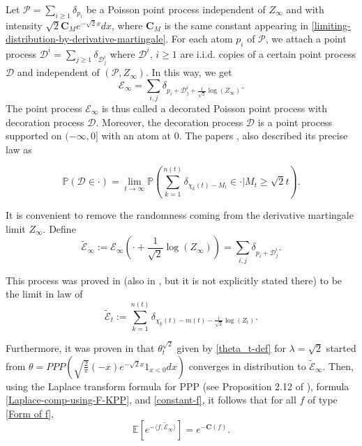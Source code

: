\documentclass[a4paper,reqno]{amsart}%
\newcommand{\Cb}{\mathbf{C}}
\newcommand{\1}{\mathbf 1}
\theoremstyle{mine}
\numberwithin{theorem}{section}
\numberwithin{equation}{section}
\theoremstyle{remark}
\begin{document}
Let $\mathcal{P}=\sum_{i\ge1}\delta_{p_i}$ be a Poisson point process independent of $Z_\infty$ and with intensity $\sqrt{2}\Cb_Me^{-\sqrt{2}x}dx$, where $\Cb_M$ is the same constant appearing in \eqref{limiting-distribution-by-derivative-martingale}. For each atom $p_i$ of $\mathcal{P}$, we attach a point process $\mathcal{D}^i=\sum_{j\ge1}\delta_{\mathcal{D}_j^i}$ where $\mathcal{D}^i$, $i\ge1$ are i.i.d. copies of a certain point process $\mathcal{D}$ and independent of $(\mathcal{P},Z_\infty)$. In this way, we get
\begin{equation}\label{def-Et}
 \mathcal{E}_{\infty} = \sum_{i, j} \delta_{p_i + \mathcal{D}^i_j + \frac{1}{\sqrt{2}}\log(Z_\infty)}.
 \end{equation}
The point process $\mathcal{E}_\infty$ is thus called a decorated Poisson point process with decoration process $\mathcal{D}$. Moreover, the decoration process $\mathcal{D}$ is a point process supported on $(-\infty,0]$ with an atom at $0$. 
The papers \cite{ABK13},\cite{ABBS13} also described its precise law as 

\begin{equation}\label{critical-deco-def}
    \mathbb P(\mathcal D\in \cdot) = \lim_{t\to\infty}\mathbb P(\sum_{k = 1}^{n(t)}\delta_{\chi_{k}(t) - M_{t} } \in \cdot | M_{t} \ge \sqrt{2}t).
\end{equation}

It is convenient to remove the randomness coming from the derivative martingale limit $Z_\infty$. Define 
\begin{equation}\label{tilde-def}
\widetilde{\mathcal{E}}_\infty := \mathcal{E}_\infty (\cdot + \frac{1}{\sqrt{2}}\log(Z_\infty))=\sum_{i, j} \delta_{p_i + \mathcal{D}^i_j}.
\end{equation} 

This process was proved in \cite{ABBS13} (also in \cite{ABK13}, but it is not explicitly stated there) to be the limit in law of 
\[\widetilde{\mathcal{E}}_{t} := \sum_{k=1}^{n(t)}\delta_{\chi_k(t)- m(t)- \frac{1}{\sqrt{2}}\log(Z_t)}.\]

Furthermore, it was proven in \cite{ABK13} that $\theta_t^{\sqrt{2}}$ given by \eqref{theta_t-def} for $\lambda = \sqrt{2}$ started from $\theta = PPP(\sqrt{\frac{2}{\pi}}(-x)e^{-\sqrt{2}x}1_{x < 0} dx)$ converges in distribution to $\widetilde{\mathcal{E}}_\infty$. Then, using the Laplace transform formula for PPP (see Proposition 2.12 of \cite{Bovier_book}), formula \eqref{Laplace-comp-using-F-KPP}, and \eqref{constant-f}, it follows that for all $f$ of type \eqref{Form of f}, 
\begin{equation}\label{critical-E-Laplace-fromula-using-C(f)}
\mathbb{E}[e^{-\langle f, \widetilde{\mathcal E}_\infty \rangle}] = e^{-\Cb(f) }. 
\end{equation}
\end{document}
